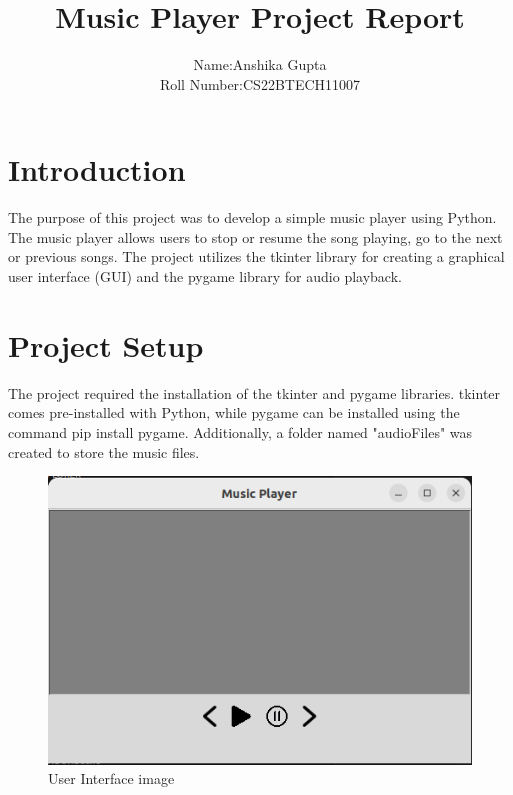 \documentclass[journal,12pt,twocolumn]{IEEEtran}
\begin{document}
\title{Music Player Project Report}
\author{Name:Anshika Gupta\\
        Roll Number:CS22BTECH11007}

\maketitle

\section{Introduction}
The purpose of this project was to develop a simple music player using Python. The music player allows users to stop or resume the song playing, go to the next or previous songs. The project utilizes the tkinter library for creating a graphical user interface (GUI) and the pygame library for audio playback.

\section{Project Setup}
The project required the installation of the tkinter and pygame libraries. tkinter comes pre-installed with Python, while pygame can be installed using the command pip install pygame. Additionally, a folder named "audioFiles" was created to store the music files.

\begin{figure}[h!]
        \includegraphics[scale = 0.5]{images/User_Interface_image.png}
        \caption{User Interface image}
        \label{fig:1}
\end{figure}
\end{document}
